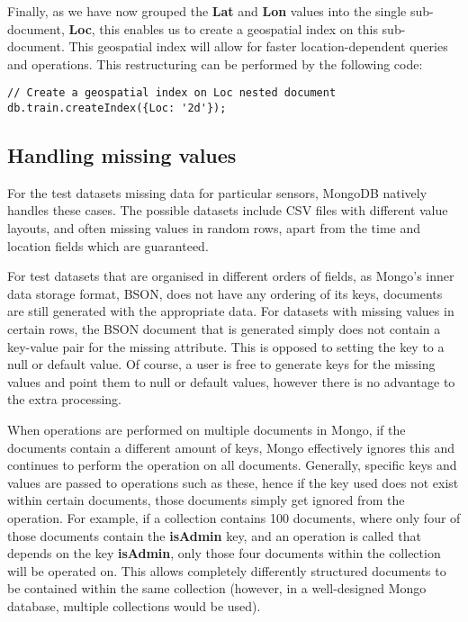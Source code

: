 \documentclass[a4paper,11pt]{article}
\begin{document}
Finally, as we have now grouped the \textbf{Lat}
and \textbf{Lon} values into the single sub-document, \textbf{Loc}, this enables us to create a geospatial index on this
sub-document.
This geospatial index will allow for faster location-dependent queries and operations.
This restructuring can be performed by the following code:

\begin{lstlisting}
// Create a geospatial index on Loc nested document
db.train.createIndex({Loc: '2d'});
\end{lstlisting}


\subsection{Handling missing values} %
\label{sub:handling_missing_values}

For the test datasets missing data for particular sensors, MongoDB natively handles these cases. The possible datasets include
CSV files with different value layouts, and often missing values in random rows, apart from the time and location fields
which are guaranteed.

For test datasets that are organised in different orders of fields, as Mongo's inner data storage format, BSON, does
not have any ordering of its keys, documents are still generated with the appropriate data. For datasets with missing
values in certain rows, the BSON document that is generated simply does not contain a key-value pair for the missing
attribute. This is opposed to setting the key to a null or default value. Of course, a user is free to generate keys
for the missing values and point them to null or default values, however there is no advantage to the extra processing.

When operations are performed on multiple documents in Mongo, if the documents contain a different amount of keys, Mongo
effectively ignores this and continues to perform the operation on all documents. Generally, specific keys and values
are passed to operations such as these, hence if the key used does not exist within certain documents, those documents
simply get ignored from the operation. For example, if a collection contains 100 documents, where only four of those
documents contain the \textbf{isAdmin} key, and an operation is called that depends on the key \textbf{isAdmin}, only
those four documents within the collection will be operated on. This allows completely differently structured documents
to be contained within the same collection (however, in a well-designed Mongo database, multiple collections would be used).
\end{document}
